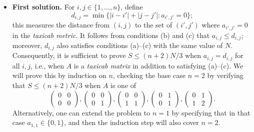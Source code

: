\documentclass[amssymb,twocolumn,pra,10pt,aps]{revtex4-1}
\begin{document}
\begin{itemize}
\item[B4]
\noindent
\textbf{First solution.}
For $i,j \in \{1,\dots,n\}$, define
\[
d_{i,j} = \min\{|i-i'|+|j-j'|\colon a_{i',j'} = 0\};
\]
this measures the distance from $(i,j)$ to the set of $(i',j')$ where $a_{i',j'}=0$ in the \emph{taxicab metric}.
It follows from conditions (b) and (c) that $a_{i,j} \leq d_{i,j}$; moreover, $d_{i,j}$ also satisfies conditions (a)--(c) with the same value of $N$. Consequently, it is sufficient to prove
$S \leq (n+2)N/3$ when $a_{i,j} = d_{i,j}$ for all $i,j$, i.e., when $A$ is a \emph{taxicab matrix}
in addition to satisfying (a)--(c). We will prove this by induction on $n$,
checking the base case $n=2$ by verifying that $S \leq (n+2)N/3$ when $A$ is one of
\[
\begin{pmatrix} 0 & 0 \\
0 & 0 \end{pmatrix},
\begin{pmatrix} 0 & 0 \\
0 & 1 \end{pmatrix},
\begin{pmatrix} 0 & 0 \\
1 & 1 \end{pmatrix},
\begin{pmatrix} 0 & 1 \\
0 & 1 \end{pmatrix},
\begin{pmatrix} 0 & 1 \\
1 & 2 \end{pmatrix}.
\]
Alternatively, one can extend the problem to $n=1$ by specifying that in that case $a_{1,1} \in \{0,1\}$, and then the induction step will also cover $n=2$.


\end{itemize}
\end{document}
